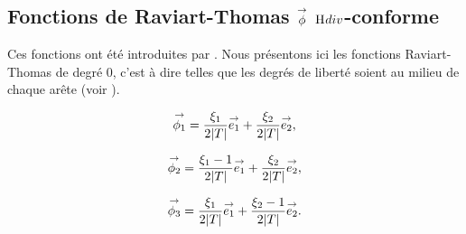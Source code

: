   \subsection[Fonctions de Raviart-Thomas phi Hdiv-conforme]{Fonctions de Raviart-Thomas \(\vect{\phi}\) \(\Hdiv\)-conforme}

    Ces fonctions ont été introduites par \cite{raviart_mixed_1977}. Nous présentons ici les fonctions Raviart-Thomas de degré 0, c'est à dire telles que les degrés de liberté soient au milieu de chaque arête (voir \cite[eq.~(3.10)]{raviart_mixed_1977}).

    \begin{minipage}{\textwidth}
      \begin{minipage}{0.329\textwidth}
          \begin{center}
            \begin{tikzpicture}[scale=1]
              
            \end{tikzpicture}
          \end{center}
          \begin{equation*}
            \vect{\phi_1}=\frac{\xi_1}{2|T|}\vect{e_1} + \frac{\xi_2}{{2|T|}}\vect{e_2},
          \end{equation*}
      \end{minipage}
      \begin{minipage}{0.329\textwidth}
          \begin{center}
            \begin{tikzpicture}[scale=1]
              
            \end{tikzpicture}
             \begin{equation*}
              \vect{\phi_2}=\frac{\xi_1-1}{2|T|}\vect{e_1} + \frac{\xi_2}{2|T|}\vect{e_2},
            \end{equation*}
          \end{center}
      \end{minipage}
      \begin{minipage}{0.329\textwidth}
          \begin{center}
            \begin{tikzpicture}[scale=1]
              
            \end{tikzpicture}
            \begin{equation*}
              \vect{\phi_3}=\frac{\xi_1}{2|T|}\vect{e_1} + \frac{\xi_2-1}{2|T|}\vect{e_2}.
            \end{equation*}
          \end{center}
      \end{minipage}
      \label{fig:form_int:fon_base:phi}
    \end{minipage}


